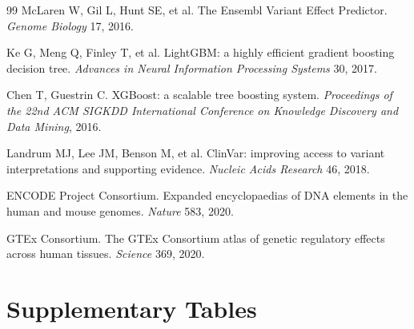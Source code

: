 \documentclass[11pt]{article}
\begin{document}
\begin{thebibliography}{99}
 McLaren W, Gil L, Hunt SE, et al. The Ensembl Variant Effect Predictor. \textit{Genome Biology} 17, 2016.

 Ke G, Meng Q, Finley T, et al. LightGBM: a highly efficient gradient boosting decision tree. \textit{Advances in Neural Information Processing Systems} 30, 2017.

 Chen T, Guestrin C. XGBoost: a scalable tree boosting system. \textit{Proceedings of the 22nd ACM SIGKDD International Conference on Knowledge Discovery and Data Mining}, 2016.

 Landrum MJ, Lee JM, Benson M, et al. ClinVar: improving access to variant interpretations and supporting evidence. \textit{Nucleic Acids Research} 46, 2018.

 ENCODE Project Consortium. Expanded encyclopaedias of DNA elements in the human and mouse genomes. \textit{Nature} 583, 2020.

 GTEx Consortium. The GTEx Consortium atlas of genetic regulatory effects across human tissues. \textit{Science} 369, 2020.

\end{thebibliography}

\clearpage
\section*{Supplementary Tables}
\end{document}

